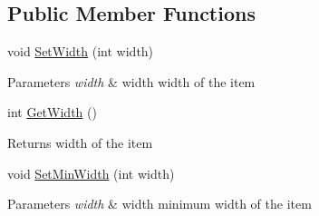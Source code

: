 \subsection*{Public Member Functions}
\begin{DoxyCompactItemize}
\item 
\mbox{\label{class_space_v_i_l_1_1_core_1_1_geometry_add9d3aed46d3f53b252ab8e2412b301f}} 
void \mbox{\hyperlink{class_space_v_i_l_1_1_core_1_1_geometry_add9d3aed46d3f53b252ab8e2412b301f}{Set\+Width}} (int width)
\begin{DoxyCompactList}\small\item\em 
\begin{DoxyParams}{Parameters}
{\em width} & width width of the item \\
\hline
\end{DoxyParams}
\end{DoxyCompactList}\item 
\mbox{\label{class_space_v_i_l_1_1_core_1_1_geometry_acfc3be053c558d6953872ad8c4fd9972}} 
int \mbox{\hyperlink{class_space_v_i_l_1_1_core_1_1_geometry_acfc3be053c558d6953872ad8c4fd9972}{Get\+Width}} ()
\begin{DoxyCompactList}\small\item\em \begin{DoxyReturn}{Returns}
width of the item 
\end{DoxyReturn}
\end{DoxyCompactList}\item 
\mbox{\label{class_space_v_i_l_1_1_core_1_1_geometry_a49761df8e894bba579a9850d21273719}} 
void \mbox{\hyperlink{class_space_v_i_l_1_1_core_1_1_geometry_a49761df8e894bba579a9850d21273719}{Set\+Min\+Width}} (int width)
\begin{DoxyCompactList}\small\item\em 
\begin{DoxyParams}{Parameters}
{\em width} & width minimum width of the item \\
\hline
\end{DoxyParams}
\end{DoxyCompactList}\item 
\mbox{\label{class_space_v_i_l_1_1_core_1_1_geometry_a2bbfcded483da237ab2a030fd75552ba}} 

\end{DoxyCompactItemize}
